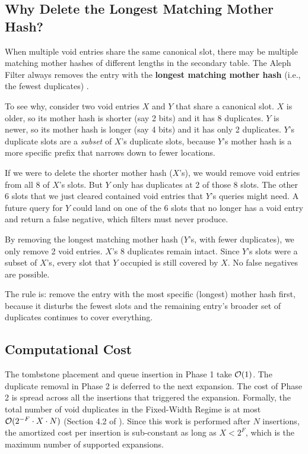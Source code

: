 \subsection{Why Delete the Longest Matching Mother Hash?}

When multiple void entries share the same canonical slot, there may 
be multiple matching mother hashes of different lengths in the 
secondary table. The Aleph Filter always removes the entry with the 
\textbf{longest matching mother hash} (i.e., the fewest duplicates) 
\cite{aleph}.

To see why, consider two void entries $X$ and $Y$ that share a 
canonical slot. $X$ is older, so its mother hash is shorter (say 2 
bits) and it has 8 duplicates. $Y$ is newer, so its mother hash is 
longer (say 4 bits) and it has only 2 duplicates. $Y$'s duplicate 
slots are a \emph{subset} of $X$'s duplicate slots, because $Y$'s 
mother hash is a more specific prefix that narrows down to fewer 
locations.

If we were to delete the shorter mother hash ($X$'s), we would 
remove void entries from all 8 of $X$'s slots. But $Y$ only has 
duplicates at 2 of those 8 slots. The other 6 slots that we just 
cleared contained void entries that $Y$'s queries might need. A 
future query for $Y$ could land on one of the 6 slots that no longer 
has a void entry and return a false negative, which filters must 
never produce.

By removing the longest matching mother hash ($Y$'s, with fewer 
duplicates), we only remove 2 void entries. $X$'s 8 duplicates 
remain intact. Since $Y$'s slots were a subset of $X$'s, every 
slot that $Y$ occupied is still covered by $X$. No false negatives 
are possible.

The rule is: remove the entry with the most specific (longest) mother 
hash first, because it disturbs the fewest slots and the remaining 
entry's broader set of duplicates continues to cover everything.

\subsection{Computational Cost}

The tombstone placement and queue insertion in Phase 1 take $\mathcal{O}(1)$.
The duplicate removal in Phase 2 is deferred to the next expansion. 
The cost of Phase 2 is spread across all the insertions that triggered 
the expansion. Formally, the total number of void duplicates in the 
Fixed-Width Regime is at most $\mathcal{O}(2^{-F} \cdot X \cdot N)$ 
(Section 4.2 of \cite{aleph}). Since this work is performed after $N$ 
insertions, the amortized cost per insertion is sub-constant as long 
as $X < 2^F$, which is the maximum number of supported expansions. 

